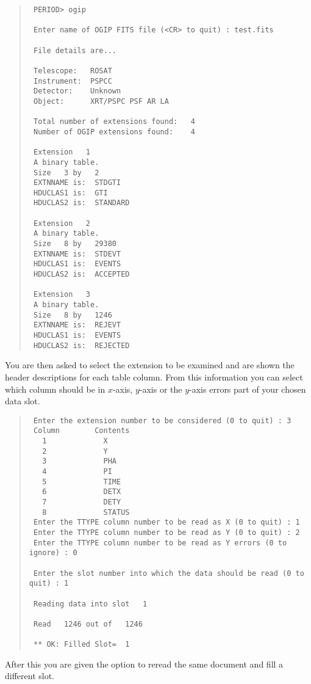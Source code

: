 \begin{quote}
\begin{verbatim}
 PERIOD> ogip

 Enter name of OGIP FITS file (<CR> to quit) : test.fits

 File details are...

 Telescope:   ROSAT
 Instrument:  PSPCC
 Detector:    Unknown
 Object:      XRT/PSPC PSF AR LA

 Total number of extensions found:   4
 Number of OGIP extensions found:    4

 Extension   1
 A binary table.
 Size   3 by   2
 EXTNNAME is:  STDGTI
 HDUCLAS1 is:  GTI
 HDUCLAS2 is:  STANDARD

 Extension   2
 A binary table.
 Size   8 by   29380
 EXTNNAME is:  STDEVT
 HDUCLAS1 is:  EVENTS
 HDUCLAS2 is:  ACCEPTED

 Extension   3
 A binary table.
 Size   8 by   1246
 EXTNNAME is:  REJEVT
 HDUCLAS1 is:  EVENTS
 HDUCLAS2 is:  REJECTED
\end{verbatim}
\end{quote}

You are then asked to select the extension to be examined and are shown
the header descriptions for each table column. From this information
you can select which column should be in $x$-axis, $y$-axis or the
$y$-axis errors part of your chosen data slot.

\begin{quote}
\begin{verbatim}
 Enter the extension number to be considered (0 to quit) : 3
 Column        Contents
   1             X
   2             Y
   3             PHA
   4             PI
   5             TIME
   6             DETX
   7             DETY
   8             STATUS
 Enter the TTYPE column number to be read as X (0 to quit) : 1
 Enter the TTYPE column number to be read as Y (0 to quit) : 2
 Enter the TTYPE column number to be read as Y errors (0 to ignore) : 0

 Enter the slot number into which the data should be read (0 to quit) : 1

 Reading data into slot   1

 Read   1246 out of   1246

 ** OK: Filled Slot=  1
\end{verbatim}
\end{quote}

After this you are given the option to reread the same document and fill a
different slot.

